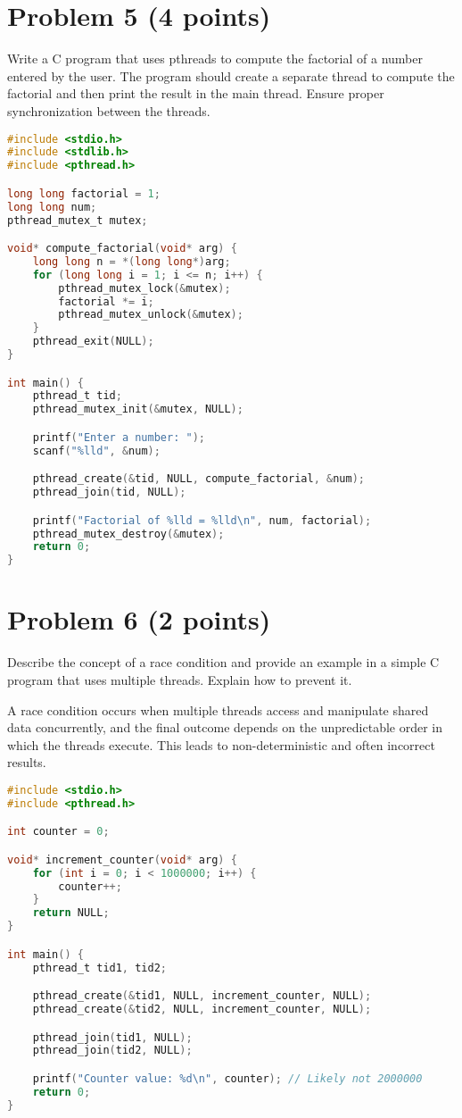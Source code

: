 \documentclass{article}
\begin{document}
\section*{Problem 5 (4 points)}

Write a C program that uses pthreads to compute the factorial of a number entered by the user.  The program should create a separate thread to compute the factorial and then print the result in the main thread.  Ensure proper synchronization between the threads.


\begin{lstlisting}[language=C, caption=Pthread Factorial Calculation]
#include <stdio.h>
#include <stdlib.h>
#include <pthread.h>

long long factorial = 1;
long long num;
pthread_mutex_t mutex;

void* compute_factorial(void* arg) {
    long long n = *(long long*)arg;
    for (long long i = 1; i <= n; i++) {
        pthread_mutex_lock(&mutex);
        factorial *= i;
        pthread_mutex_unlock(&mutex);
    }
    pthread_exit(NULL);
}

int main() {
    pthread_t tid;
    pthread_mutex_init(&mutex, NULL);

    printf("Enter a number: ");
    scanf("%lld", &num);

    pthread_create(&tid, NULL, compute_factorial, &num);
    pthread_join(tid, NULL);

    printf("Factorial of %lld = %lld\n", num, factorial);
    pthread_mutex_destroy(&mutex);
    return 0;
}

\end{lstlisting}


\section*{Problem 6 (2 points)}

Describe the concept of a race condition and provide an example in a simple C program that uses multiple threads.  Explain how to prevent it.


A race condition occurs when multiple threads access and manipulate shared data concurrently, and the final outcome depends on the unpredictable order in which the threads execute. This leads to non-deterministic and often incorrect results.

\begin{lstlisting}[language=C, caption=Race Condition Example]
#include <stdio.h>
#include <pthread.h>

int counter = 0;

void* increment_counter(void* arg) {
    for (int i = 0; i < 1000000; i++) {
        counter++;
    }
    return NULL;
}

int main() {
    pthread_t tid1, tid2;

    pthread_create(&tid1, NULL, increment_counter, NULL);
    pthread_create(&tid2, NULL, increment_counter, NULL);

    pthread_join(tid1, NULL);
    pthread_join(tid2, NULL);

    printf("Counter value: %d\n", counter); // Likely not 2000000
    return 0;
}
\end{lstlisting}
\end{document}

